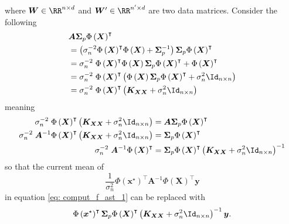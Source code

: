 where $\bm{W} \in \RR^{n \times d}$ and $\bm{W}' \in \RR^{n' \times d}$ are two data matrices. Consider the following
\begin{align*}
     & \bm{A} \bm{\Sigma}_p {\Phi \left( \bm{X} \right)}^{\intercal}                                                                                                                                \\
     & = \left( \sigma_n^{-2} {\Phi \left( \bm{X} \right)}^{\intercal} \Phi \left( \bm{X} \right) + \bm{\Sigma}_p^{-1} \right) \bm{\Sigma}_p {\Phi \left( \bm{X} \right)}^{\intercal}               \\
     & = \sigma_n^{-2} \; {\Phi \left( \bm{X} \right)}^{\intercal} \Phi \left( \bm{X} \right) \bm{\Sigma}_p {\Phi \left( \bm{X} \right)}^{\intercal} + {\Phi \left( \bm{X} \right)}^{\intercal}     \\
     & = \sigma_n^{-2} \; {\Phi \left( \bm{X} \right)}^{\intercal} \left( \Phi \left( \bm{X} \right) \bm{\Sigma}_p {\Phi \left( \bm{X} \right)}^{\intercal} + \sigma_n^{2} \Id_{n \times n} \right) \\
     & = \sigma_n^{-2} \; {\Phi \left( \bm{X} \right)}^{\intercal} \left( \bm{K}_{\bm{X} \bm{X}} + \sigma_n^{2} \Id_{n \times n} \right)
\end{align*}
meaning
\begin{align*}
    \sigma_n^{-2} \; {\Phi \left( \bm{X} \right)}^{\intercal} \left( \bm{K}_{\bm{X} \bm{X}} + \sigma_n^{2} \Id_{n \times n} \right)             & = \bm{A} \bm{\Sigma}_p {\Phi \left( \bm{X} \right)}^{\intercal}                                                                     \\
    \sigma_n^{-2} \; \bm{A}^{-1} {\Phi \left( \bm{X} \right)}^{\intercal} \left( \bm{K}_{\bm{X} \bm{X}} + \sigma_n^{2} \Id_{n \times n} \right) & = \bm{\Sigma}_p {\Phi \left( \bm{X} \right)}^{\intercal}                                                                            \\
    \sigma_n^{-2} \; \bm{A}^{-1} {\Phi \left( \bm{X} \right)}^{\intercal}                                                                       & = \bm{\Sigma}_p {\Phi \left( \bm{X} \right)}^{\intercal} \left( \bm{K}_{\bm{X} \bm{X}} + \sigma_n^{2} \Id_{n \times n} \right)^{-1}
\end{align*}
so that the current mean of
\[
    \frac{1}{\sigma_n^2} \Phi \left( \bm{x}^{\star} \right)^{\intercal} \bm{A}^{-1} {\Phi \left( \bm{X} \right)}^{\intercal} \bm{y}
\]
in equation \ref{eq: comput_f_ast_1} can be replaced with
\[
    \Phi \left( \bm{x}^{\star} \right)^{\intercal} \bm{\Sigma}_p {\Phi \left( \bm{X} \right)}^{\intercal} \left( \bm{K}_{\bm{X} \bm{X}} + \sigma_n^{2} \Id_{n \times n} \right)^{-1} \bm{y}.
\]
